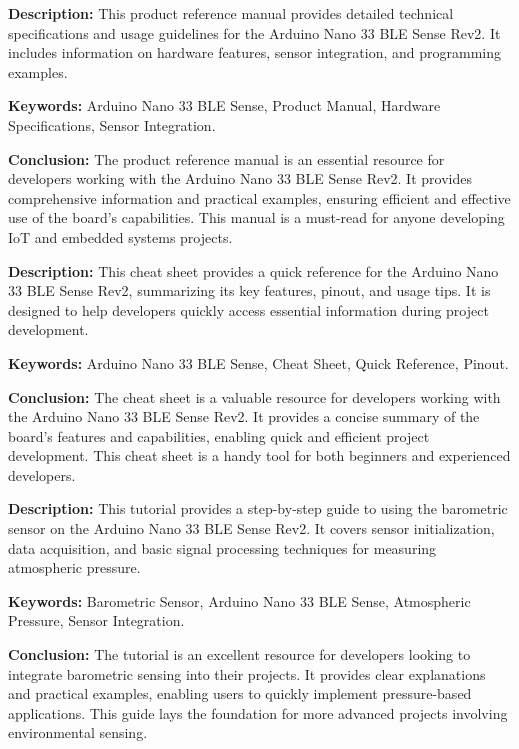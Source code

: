 {
	\textbf{Description:} This product reference manual provides detailed technical specifications and usage guidelines for the Arduino Nano 33 BLE Sense Rev2. It includes information on hardware features, sensor integration, and programming examples.
	\newline
	
	\textbf{Keywords:} Arduino Nano 33 BLE Sense, Product Manual, Hardware Specifications, Sensor Integration.
	
	\newpage
	\textbf{Conclusion:} The product reference manual is an essential resource for developers working with the Arduino Nano 33 BLE Sense Rev2. It provides comprehensive information and practical examples, ensuring efficient and effective use of the board's capabilities. This manual is a must-read for anyone developing IoT and embedded systems projects\cite{Arduino:2024a}.
}

{
	\textbf{Description:} This cheat sheet provides a quick reference for the Arduino Nano 33 BLE Sense Rev2, summarizing its key features, pinout, and usage tips. It is designed to help developers quickly access essential information during project development.
	\newline
	
	\textbf{Keywords:} Arduino Nano 33 BLE Sense, Cheat Sheet, Quick Reference, Pinout.
	
	\newpage
	\textbf{Conclusion:} The cheat sheet is a valuable resource for developers working with the Arduino Nano 33 BLE Sense Rev2. It provides a concise summary of the board's features and capabilities, enabling quick and efficient project development. This cheat sheet is a handy tool for both beginners and experienced developers\cite{Arduino:2024b}.
}

{
	\textbf{Description:} This tutorial provides a step-by-step guide to using the barometric sensor on the Arduino Nano 33 BLE Sense Rev2. It covers sensor initialization, data acquisition, and basic signal processing techniques for measuring atmospheric pressure.
	\newline
	
	\textbf{Keywords:} Barometric Sensor, Arduino Nano 33 BLE Sense, Atmospheric Pressure, Sensor Integration.
	
	\newpage
	\textbf{Conclusion:} The tutorial is an excellent resource for developers looking to integrate barometric sensing into their projects. It provides clear explanations and practical examples, enabling users to quickly implement pressure-based applications. This guide lays the foundation for more advanced projects involving environmental sensing\cite{Arduino:2024c}.
}

